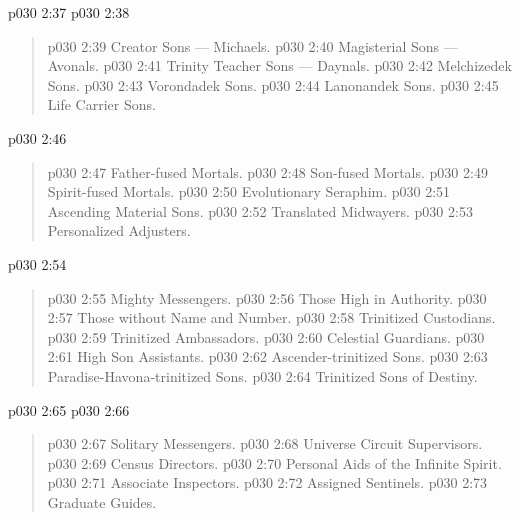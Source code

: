 \vsetspace
\vs p030 2:37 \bibnobreakspace {}
\vsetspace
\vs p030 2:38 \bibnobreakspace {}
\begin{quote}
\vs p030 2:39 \bibnobreakspace Creator Sons --- Michaels.
\vs p030 2:40 \bibnobreakspace Magisterial Sons --- Avonals.
\vs p030 2:41 \bibnobreakspace Trinity Teacher Sons --- Daynals.
\vs p030 2:42 \bibnobreakspace Melchizedek Sons.
\vs p030 2:43 \bibnobreakspace Vorondadek Sons.
\vs p030 2:44 \bibnobreakspace Lanonandek Sons.
\vs p030 2:45 \bibnobreakspace Life Carrier Sons.
\end{quote}
\vsetspace
\vs p030 2:46 \bibnobreakspace {}
\begin{quote}
\vs p030 2:47 \bibnobreakspace Father\hyp{}fused Mortals.
\vs p030 2:48 \bibnobreakspace Son\hyp{}fused Mortals.
\vs p030 2:49 \bibnobreakspace Spirit\hyp{}fused Mortals.
\vs p030 2:50 \bibnobreakspace Evolutionary Seraphim.
\vs p030 2:51 \bibnobreakspace Ascending Material Sons.
\vs p030 2:52 \bibnobreakspace Translated Midwayers.
\vs p030 2:53 \bibnobreakspace Personalized Adjusters.
\end{quote}
\vsetspace
\vs p030 2:54 \bibnobreakspace {}
\begin{quote}
\vs p030 2:55 \bibnobreakspace Mighty Messengers.
\vs p030 2:56 \bibnobreakspace Those High in Authority.
\vs p030 2:57 \bibnobreakspace Those without Name and Number.
\vs p030 2:58 \bibnobreakspace Trinitized Custodians.
\vs p030 2:59 \bibnobreakspace Trinitized Ambassadors.
\vs p030 2:60 \bibnobreakspace Celestial Guardians.
\vs p030 2:61 \bibnobreakspace High Son Assistants.
\vs p030 2:62 \bibnobreakspace Ascender\hyp{}trinitized Sons.
\vs p030 2:63 \bibnobreakspace Paradise\hyp{}Havona\hyp{}trinitized Sons.
\vs p030 2:64 \bibnobreakspace Trinitized Sons of Destiny.
\end{quote}
\vsetspace
\vs p030 2:65 \bibnobreakspace {}
\vsetspace
\vs p030 2:66 \bibnobreakspace {}
\begin{quote}
\vs p030 2:67 \bibnobreakspace Solitary Messengers.
\vs p030 2:68 \bibnobreakspace Universe Circuit Supervisors.
\vs p030 2:69 \bibnobreakspace Census Directors.
\vs p030 2:70 \bibnobreakspace Personal Aids of the Infinite Spirit.
\vs p030 2:71 \bibnobreakspace Associate Inspectors.
\vs p030 2:72 \bibnobreakspace Assigned Sentinels.
\vs p030 2:73 \bibnobreakspace Graduate Guides.
\end{quote}

